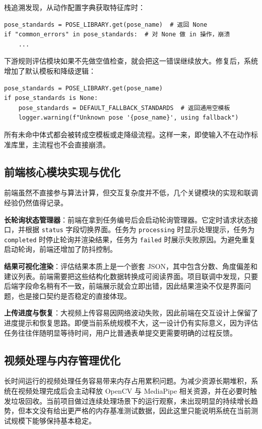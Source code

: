\documentclass[UTF8,twoside]{ctexrep}
\makeatletter
\def@NAT@last@yr{\@citea}%
\def@NAT@last@yr{-\NAT@penalty}%
\makeatother
\begin{document}
栈追溯发现，从动作配置字典获取特征库时：
\begin{verbatim}
pose_standards = POSE_LIBRARY.get(pose_name)  # 返回 None
if "common_errors" in pose_standards:  # 对 None 做 in 操作，崩溃
    ...
\end{verbatim}
下游规则评估模块如果不先做空值检查，就会把这一错误继续放大。修复后，系统增加了默认模板和降级逻辑：
\begin{verbatim}
pose_standards = POSE_LIBRARY.get(pose_name)
if pose_standards is None:
    pose_standards = DEFAULT_FALLBACK_STANDARDS  # 返回通用空模板
    logger.warning(f"Unknown pose '{pose_name}', using fallback")
\end{verbatim}
所有未命中体式都会被转成空模板或走降级流程。这样一来，即使输入不在动作标准库里，主流程也不会直接崩溃。

\subsection{前端核心模块实现与优化}
前端虽然不直接参与算法计算，但交互复杂度并不低，几个关键模块的实现和联调经验仍然值得记录。

\textbf{长轮询状态管理器}：前端在拿到任务编号后会启动轮询管理器。它定时请求状态接口，并根据 \texttt{status} 字段切换界面。任务为 \texttt{processing} 时显示处理提示，任务为 \texttt{completed} 时停止轮询并渲染结果，任务为 \texttt{failed} 时展示失败原因。为避免重复启动轮询，前端还增加了防抖控制。

\textbf{结果可视化渲染}：评估结果本质上是一个嵌套 JSON，其中包含分数、角度偏差和建议列表。前端需要把这些结构化数据转换成可阅读界面。项目联调中发现，只要后端字段命名稍有不一致，前端展示就会立即出错，因此结果渲染不仅是界面问题，也是接口契约是否稳定的直接体现。

\textbf{上传进度与恢复}：大视频上传容易因网络波动失败，因此前端在交互设计上保留了进度提示和恢复思路。即便当前系统规模不大，这一设计仍有实际意义，因为评估任务往往伴随明显等待时间，用户比普通表单提交更需要明确的过程反馈。

\subsection{视频处理与内存管理优化}
长时间运行的视频处理任务容易带来内存占用累积问题。为减少资源长期堆积，系统在视频处理完成后会主动释放 OpenCV 与 MediaPipe 相关资源，并在必要时触发垃圾回收。当前项目做过连续处理场景下的运行观察，未出现明显的持续增长趋势，但本文没有给出更严格的内存基准测试数据，因此这里只能说明系统在当前测试规模下能够保持基本稳定。
\end{document}
